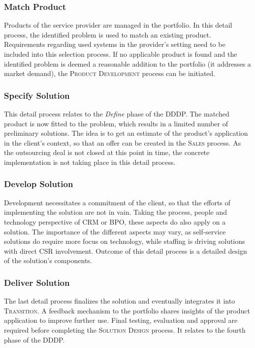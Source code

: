 	\subsubsection{Match Product}
	Products of the service provider are managed in the portfolio. In this detail process, the identified problem is used to match an existing product. Requirements regarding used systems in the provider's setting need to be included into this selection process. If no applicable product is found and the identified problem is deemed a reasonable addition to the portfolio (\ie it addresses a market demand), the \textsc{Product Development} process can be initiated. 
	
	\subsubsection{Specify Solution}
	This detail process relates to the \textit{Define} phase of the \acrshort{DDDP}. The matched product is now fitted to the problem, which results in a limited number of preliminary solutions. The idea is to get an estimate of the product's application in the client's context, so that an offer can be created in the \textsc{Sales} process. As the outsourcing deal is not closed at this point in time, the concrete implementation is not taking place in this detail process. 
	
	\subsubsection{Develop Solution}
	Development necessitates a commitment of the client, so that the efforts of implementing the solution are not in vain. Taking the process, people and technology perspective of \acrshort{CRM} or \acrshort{BPO}, these aspects do also apply on a solution. The importance of the different aspects may vary, as self-service solutions do require more focus on technology, while staffing is driving solutions with direct \acrshort{CSR} involvement. Outcome of this detail process is a detailed design of the solution's components. 
	
	\subsubsection{Deliver Solution}
	
	The last detail process finalizes the solution and eventually integrates it into \textsc{Transition}. A feedback mechanism to the portfolio shares insights of the product application to improve further use. Final testing, evaluation and approval are required before completing the \textsc{Solution Design} process. It relates to the fourth phase of the \acrshort{DDDP}.
	
